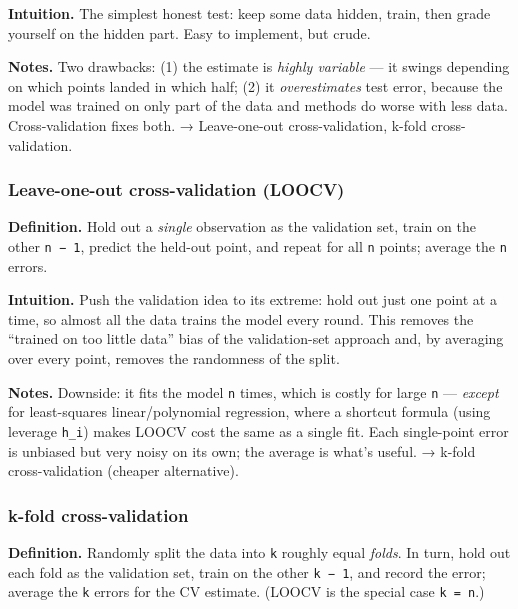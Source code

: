 \documentclass[
  10pt,
  letterpaper,
  onecolumn]{article}
\begin{document}
\textbf{Intuition.} The simplest honest test: keep some data hidden,
train, then grade yourself on the hidden part. Easy to implement, but
crude.

\textbf{Notes.} Two drawbacks: (1) the estimate is \emph{highly
variable} --- it swings depending on which points landed in which half;
(2) it \emph{overestimates} test error, because the model was trained on
only part of the data and methods do worse with less data.
Cross-validation fixes both. → Leave-one-out cross-validation, k-fold
cross-validation.

\hypertarget{leave-one-out-cross-validation-loocv}{%
\subsubsection{Leave-one-out cross-validation
(LOOCV)}\label{leave-one-out-cross-validation-loocv}}

\textbf{Definition.} Hold out a \emph{single} observation as the
validation set, train on the other \texttt{n\ −\ 1}, predict the
held-out point, and repeat for all \texttt{n} points; average the
\texttt{n} errors.

\textbf{Intuition.} Push the validation idea to its extreme: hold out
just one point at a time, so almost all the data trains the model every
round. This removes the ``trained on too little data'' bias of the
validation-set approach and, by averaging over every point, removes the
randomness of the split.

\textbf{Notes.} Downside: it fits the model \texttt{n} times, which is
costly for large \texttt{n} --- \emph{except} for least-squares
linear/polynomial regression, where a shortcut formula (using leverage
\texttt{h\_i}) makes LOOCV cost the same as a single fit. Each
single-point error is unbiased but very noisy on its own; the average is
what's useful. → k-fold cross-validation (cheaper alternative).

\hypertarget{k-fold-cross-validation}{%
\subsubsection{k-fold cross-validation}\label{k-fold-cross-validation}}

\textbf{Definition.} Randomly split the data into \texttt{k} roughly
equal \emph{folds}. In turn, hold out each fold as the validation set,
train on the other \texttt{k\ −\ 1}, and record the error; average the
\texttt{k} errors for the CV estimate. (LOOCV is the special case
\texttt{k\ =\ n}.)
\end{document}
